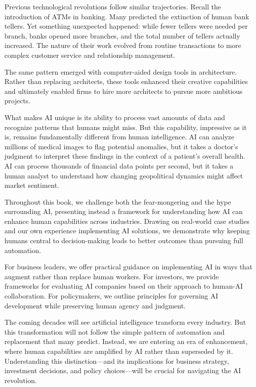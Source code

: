 \documentclass[
  Letterpaper,
]{scrbook}
\begin{document}
Previous technological revolutions follow similar trajectories. Recall
the introduction of ATMs in banking. Many predicted the extinction of
human bank tellers. Yet something unexpected happened: while fewer
tellers were needed per branch, banks opened more branches, and the
total number of tellers actually increased. The nature of their work
evolved from routine transactions to more complex customer
service and relationship management.

The same pattern emerged with computer-aided design tools in
architecture. Rather than replacing architects, these tools enhanced
their creative capabilities and ultimately enabled firms to hire more
architects to pursue more ambitious projects.

What makes AI unique is its ability to process vast amounts of data and
recognize patterns that humans might miss. But this capability,
impressive as it is, remains fundamentally different from human
intelligence. AI can analyze millions of medical images to flag
potential anomalies, but it takes a doctor's judgment to interpret these
findings in the context of a patient's overall health. AI can process
thousands of financial data points per second, but it takes a human
analyst to understand how changing geopolitical dynamics might affect
market sentiment.

Throughout this book, we challenge both the fear-mongering and the hype
surrounding AI, presenting instead a framework for understanding how AI
can enhance human capabilities across industries. Drawing on real-world
case studies and our own experience implementing AI solutions, we
demonstrate why keeping humans central to
decision-making leads to better
outcomes than pursuing full automation.

For business leaders, we offer practical guidance on implementing AI in
ways that augment rather than replace human workers. For investors, we
provide frameworks for evaluating AI companies based on their approach
to human-AI
collaboration. For
policymakers, we outline principles for governing AI development while
preserving human agency and
judgment.

The coming decades will see artificial intelligence transform every
industry. But this transformation will not follow the simple pattern of
automation and replacement that many predict. Instead, we are entering
an era of enhancement, where
human capabilities are amplified by AI rather than superseded by it.
Understanding this distinction---and its implications for business
strategy, investment decisions, and policy choices---will be crucial for
navigating the AI revolution.
\end{document}
